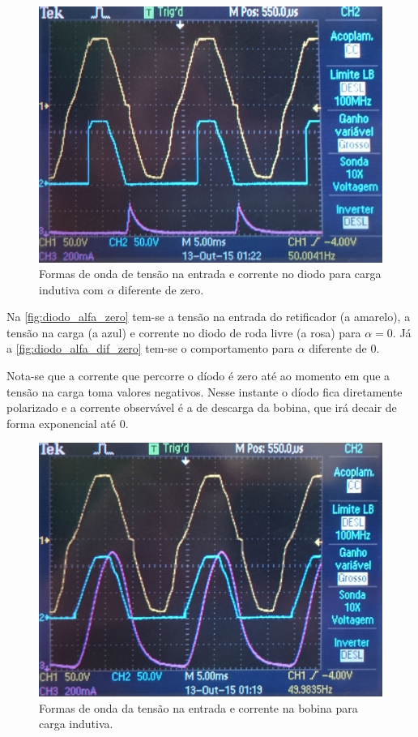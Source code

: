 \documentclass[a4paper,11pt]{article}
\numberwithin{equation}{section}
\begin{document}
\begin{figure}[H]
	\centering
	\includegraphics[keepaspectratio=true, scale=0.12]{img/figs/diodo_alfa_dif_zero}
	\caption{Formas de onda de tensão na entrada e corrente no diodo para carga indutiva com $\alpha$ diferente de zero.}
	\label{fig:diodo_alfa_dif_zero}
	\vspace{-0.8em}
\end{figure}

Na \autoref{fig:diodo_alfa_zero} tem-se a tensão na entrada do retificador (a amarelo), a tensão na carga (a azul) e corrente no diodo de roda livre (a rosa) para $\alpha = 0$. Já a \autoref{fig:diodo_alfa_dif_zero} tem-se o comportamento para $\alpha$ diferente de $0$.

Nota-se que a corrente que percorre o díodo é zero até ao momento em que a tensão na carga toma valores negativos. Nesse instante o díodo fica diretamente polarizado e a corrente observável é a de descarga da bobina, que irá decair de forma exponencial até $0$.

\begin{figure}[h]
	\centering
	\includegraphics[keepaspectratio=true, scale=0.11]{img/figs/bobine_alfa_zero}
	\caption{Formas de onda da tensão na entrada e corrente na bobina para carga indutiva.}
	\label{fig:bobine_alfa_zero}
	\vspace{-0.8em}
\end{figure}
\end{document}
